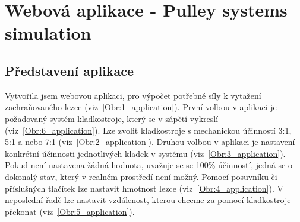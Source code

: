\chapter{Webová aplikace - Pulley systems simulation}
\label{Webova_aplikace}
\def\figurename{Obr.} %
\def\tablename{Tab.} %
\def\figureautorefname{obr.} %
\def\tableautorefname{tab.} %
\def\chapterautorefname{kapitola} %

\section{Představení aplikace}

Vytvořila jsem webovou aplikaci, pro výpočet potřebné síly k vytažení zachraňovaného lezce (viz~\autoref{Obr:1_application}). První volbou v aplikaci je požadovaný systém kladkostroje, který se v zápětí vykreslí (viz~\autoref{Obr:6_application}). Lze zvolit kladkostroje s mechanickou účinností 3:1, 5:1 a nebo 7:1 (viz~\autoref{Obr:2_application}). Druhou volbou v aplikaci je nastavení konkrétní účinnosti jednotlivých kladek v systému (viz~\autoref{Obr:3_application}). Pokud není nastavena žádná hodnota, uvažuje se se 100\% účinností, jedná se o dokonalý stav, který v realném prostředí není možný. Pomocí posuvníku či příslušných tlačítek lze nastavit hmotnost lezce (viz~\autoref{Obr:4_application}). V neposlední řadě lze nastavit vzdálenost, kterou chceme za pomocí kladkostroje překonat (viz~\autoref{Obr:5_application}). 

